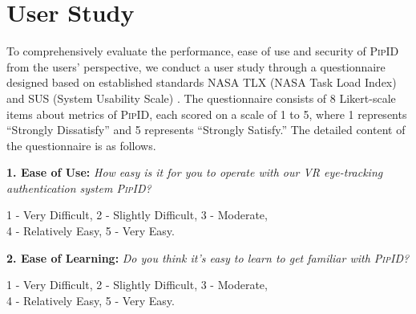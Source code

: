 \documentclass[sigconf]{acmart}
\newcommand{\sysname}{\textsc{PipID}\xspace}
\begin{document}
\begin{table}[t]
\centering
\caption{Performance comparison between different parameter optimization methods on Extra Trees.}
\label{tab: parameter optimazation}
\end{table}



\section{User Study}
\label{sec: appendix: user study}
To comprehensively evaluate the performance, ease of use and security of \sysname from the users' perspective, we conduct a user study through a questionnaire designed based on established standards NASA TLX (NASA Task Load Index) \cite{nasa_document} and SUS (System Usability Scale) \cite{SUS}. The questionnaire consists of $8$ Likert-scale items about metrics of \sysname, each scored on a scale of 1 to 5, where 1 represents ``Strongly Dissatisfy'' and 5 represents ``Strongly Satisfy.'' The detailed content of the questionnaire is as follows.

\begin{tcolorbox}[notitle, boxrule=0pt,left=0.2cm, right=0.2cm, top=0.1cm, bottom=0.1cm]
\textbf{1. Ease of Use:} \textit{How easy is it for you to operate with our VR eye-tracking authentication system \sysname?}

1 - Very Difficult, 2 - Slightly Difficult, 3 - Moderate,\\ 4 - Relatively Easy, 5 - Very Easy.
\end{tcolorbox} 

\begin{tcolorbox}[notitle, boxrule=0pt,left=0.2cm, right=0.2cm, top=0.1cm, bottom=0.1cm]
\textbf{2. Ease of Learning:} \textit{Do you think it's easy to learn to get familiar with \sysname? }

1 - Very Difficult, 2 - Slightly Difficult, 3 - Moderate, \\ 4 - Relatively Easy, 5 - Very Easy.
\end{tcolorbox} 
\end{document}
